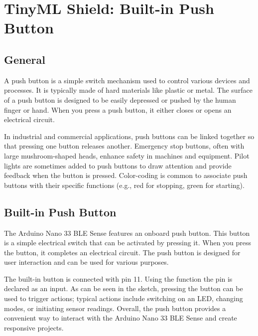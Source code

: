 %
%

\chapter{TinyML Shield: Built-in Push Button}

\section{General}

A push button is a simple switch mechanism used to control various devices and processes. It is typically made of hard materials like plastic or metal.
The surface of a push button is designed to be easily depressed or pushed by the human finger or hand. When you press a push button, it either closes or opens an electrical circuit. 

In industrial and commercial applications, push buttons can be linked together so that pressing one button releases another. Emergency stop buttons, often with large mushroom-shaped heads, enhance safety in machines and equipment. Pilot lights are sometimes added to push buttons to draw attention and provide feedback when the button is pressed. Color-coding is common to associate push buttons with their specific functions (e.g., red for stopping, green for starting). \cite{DIN:13850}







\section{Built-in Push Button}

The Arduino Nano 33 BLE Sense features an onboard push button. This button is a simple electrical switch that can be activated by pressing it. When you press the button, it completes an electrical circuit. The push button is designed for user interaction and can be used for various purposes.

The built-in button  is connected with pin 11. Using the function  the pin is declared as an input. As can be seen in the sketch, pressing the button can be used to trigger actions; typical actions include switching on an LED, changing modes, or initiating sensor readings.
Overall, the push button provides a convenient way to interact with the Arduino Nano 33 BLE Sense and create responsive projects. \cite{Arduino:2023a,Arduino:2023,ArduinoNano33Manual:2022}


